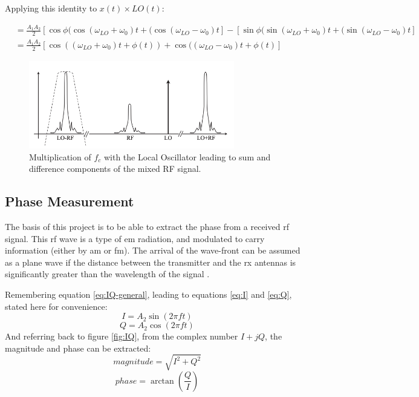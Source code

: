 \documentclass[class=report,11pt,crop=false]{standalone}
\begin{document}
Applying this identity to $x(t) \times LO(t)$:

\begin{equation*}
\begin{split}
    & = \frac{A_1 A_2}{2} [\cos \phi (\cos(\omega_{LO} + \omega_0)t + (\cos(\omega_{LO} - \omega_0)t ] - [\sin \phi (\sin(\omega_{LO} + \omega_0)t + (\sin(\omega_{LO} - \omega_0)t ] \\
    & = \frac{A_1 A_2}{2} [\cos((\omega_{LO} + \omega_0)t + \phi(t)) + \cos((\omega_{LO} - \omega_0)t + \phi(t)]
\end{split}
\end{equation*}

\begin{figure}[h]
    \centering
    \includegraphics[width=0.8\textwidth]{Images/diagrams/LO_convolution.png}
    \caption{Multiplication of $f_c$ with the Local Oscillator leading to sum and difference components of the mixed RF signal.}
    \label{fig:LO}
\end{figure}

\subsection{Phase Measurement \label{phase-measurement}}
The basis of this project is to be able to extract the phase from a received \gls{rf} signal. 
This \gls{rf} wave is a type of \gls{em} radiation, and modulated to carry information (either by \gls{am} or \gls{fm}). The arrival of the wave-front can be assumed as a plane wave if the distance between the transmitter and the \gls{rx} antennas is significantly greater than the wavelength of the signal \cite{phase-diff-calc}. 

Remembering equation \ref{eq:IQ-general}, leading to equations \ref{eq:I} and \ref{eq:Q}, stated here for convenience:
\begin{equation}
    I = A_2 \sin(2 \pi f t) 
    \label{eq:I}
\end{equation}
\begin{equation}
    Q = A_2 \cos(2 \pi f t)
    \label{eq:Q}
\end{equation}
And referring back to figure \ref{fig:IQ}, from the complex number $I + j Q$, the magnitude and phase can be extracted:
\begin{equation}
    magnitude = \sqrt{I^2 + Q^2} 
\end{equation}
\begin{equation}
    phase = \arctan (\frac{Q}{I})
\end{equation}
\end{document}
